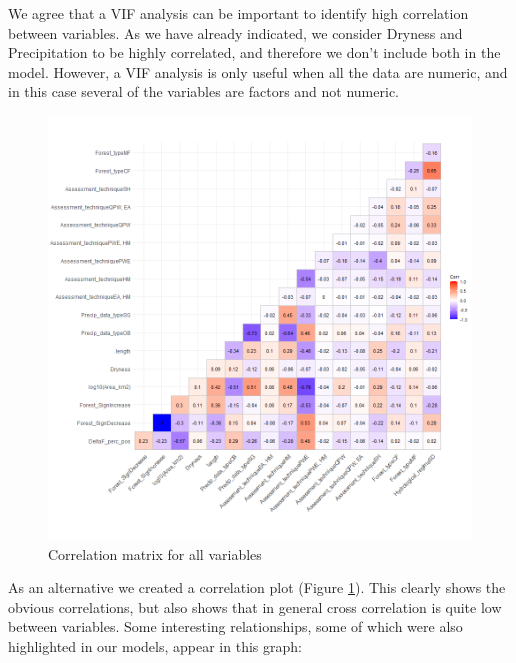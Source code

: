 \documentclass[]{elsarticle} %
\begin{document}
We agree that a VIF analysis can be important to identify high correlation between variables. As we have already indicated, we consider Dryness and Precipitation to be highly correlated, and therefore we don't include both in the model. However, a VIF analysis is only useful when all the data are numeric, and in this case several of the variables are factors and not numeric.

\begin{figure}
\includegraphics[width=0.9\linewidth]{./testcorr_plot} \caption{Correlation matrix for all variables}\label{fig:corgraphs}
\end{figure}

As an alternative we created a correlation plot (Figure \ref{fig:corgraphs}). This clearly shows the obvious correlations, but also shows that in general cross correlation is quite low between variables. Some interesting relationships, some of which were also highlighted in our models, appear in this graph:
\end{document}
